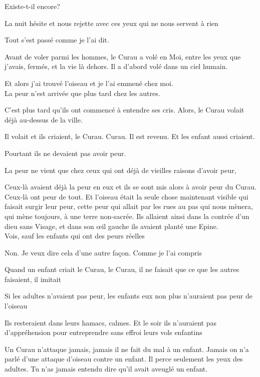 Existe-t-il encore?

La nuit hésite et nous rejette avec ces yeux qui ne nous servent à rien

Tout s'est passé comme je l'ai dit.

Avant de voler parmi les hommes, le Curau a volé en Moi, entre les yeux
que j'avais, fermés, et la vie là dehors. Il a d'abord volé dans un ciel
humain.

Et alors j'ai trouvé l'oiseau et je l'ai emmené chez moi.\\

La peur n'est arrivée que plus tard chez les autres.

C'est plus tard qu'ils ont commencé à entendre ses cris. Alors, le Curau
volait déjà au-dessus de la ville.

Il volait et ils criaient, le Curau. Curau. Il est revenu. Et les enfant
aussi criaient.

Pourtant ils ne devaient pas avoir peur.

La peur ne vient que chez ceux qui ont déjà de vieilles raisons d'avoir
peur,

Ceux-là avaient déjà la peur en eux et ils se sont mis alors à avoir
peur du Curau. Ceux-là ont peur de tout. Et l'oiseau était la seule
chose maintenant visible qui faisait surgir leur peur, cette peur qui
allait par les rues au pas qui nous mènera, qui mène toujours, à une
terre non-sacrée. Ils allaient ainsi dans la contrée d'un dieu sans
Visage, et dans son œil gauche ils avaient planté une Epine.\\

Vois, sauf les enfants qui ont des peurs réelles

Non. Je veux dire cela d'une autre façon. Comme je l'ai compris

Quand un enfant criait le Curau, le Curau, il ne faisait que ce que les
autres faisaient, il imitait

Si les adultes n'avaient pas peur, les enfants eux non plus n'auraient
pas peur de l'oiseau

Ils resteraient dans leurs hamacs, calmes. Et le soir ils n'auraient pas
d'appréhension pour entreprendre sans effroi leurs vols enfantins

Un Curau n'attaque jamais, jamais il ne fait du mal à un enfant. Jamais
on n'a parlé d'une attaque d'oiseau contre un enfant. Il perce seulement
les yeux des adultes. Tu n'as jamais entendu dire qu'il avait aveuglé un
enfant.\\

